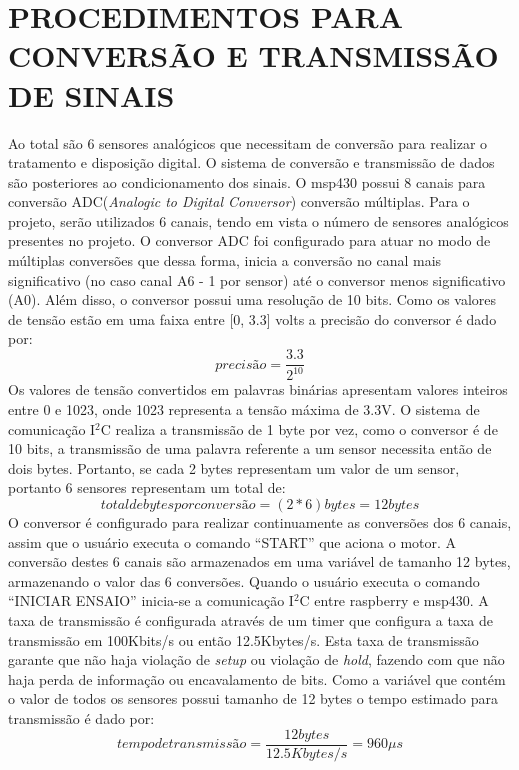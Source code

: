 \section{PROCEDIMENTOS PARA CONVERSÃO E TRANSMISSÃO DE SINAIS}
Ao total são 6 sensores analógicos que necessitam de conversão para realizar o tratamento e disposição digital. O sistema de conversão e transmissão de dados são posteriores ao condicionamento dos sinais.
O msp430 possui 8 canais para conversão ADC(\textit{Analogic to Digital Conversor}) conversão múltiplas. Para o projeto, serão utilizados 6 canais, tendo em vista o número de sensores analógicos presentes no projeto. O conversor ADC foi configurado para atuar no modo de múltiplas conversões que dessa forma, inicia a conversão no canal mais significativo (no caso canal A6 - 1 por sensor) até o conversor menos significativo (A0). Além disso, o conversor possui uma resolução de 10 bits. Como os valores de tensão estão em uma faixa entre [0, 3.3] volts a precisão do conversor é dado por:
\begin{equation}
precisão = \frac{3.3}{2^{10}}
\end{equation}
Os valores de tensão convertidos em palavras binárias apresentam valores inteiros entre 0 e 1023, onde 1023 representa a tensão máxima de 3.3V.
O sistema de comunicação I$^{2}$C realiza a transmissão de 1 byte por vez, como o conversor é de 10 bits, a transmissão de uma palavra referente a um sensor necessita então de dois bytes. Portanto, se cada 2 bytes representam um valor de um sensor, portanto 6 sensores representam um total de:
\begin{equation}
total de bytes por conversão = (2*6)bytes = 12bytes
\end{equation}
O conversor é configurado para realizar continuamente as conversões dos 6 canais, assim que o usuário executa o comando “START” que aciona o motor. A conversão destes 6 canais são armazenados em uma variável de tamanho 12 bytes, armazenando o valor das 6 conversões.
Quando o usuário executa o comando “INICIAR ENSAIO” inicia-se a comunicação I$^{2}$C entre raspberry e msp430. A taxa de transmissão é configurada através de um timer que configura a taxa de transmissão em 100Kbits/s ou então 12.5Kbytes/s. Esta taxa de transmissão garante que não haja violação de \textit{setup} ou violação de \textit{hold}, fazendo com que não haja perda de informação ou encavalamento de bits.
Como a variável que contém o valor de todos os sensores possui tamanho de 12 bytes o tempo estimado para transmissão é dado por:
\begin{equation}
tempo de transmissão = \frac{12bytes}{12.5Kbytes/s} = 960 \mu s
\end{equation}
